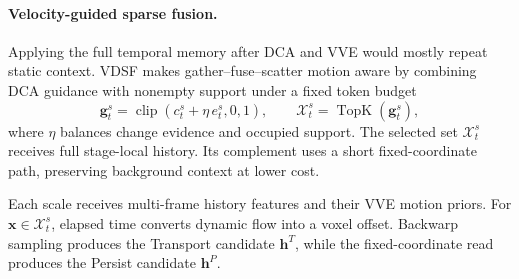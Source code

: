 \documentclass{article}
\begin{document}
\paragraph{Velocity-guided sparse fusion.}
Applying the full temporal memory after DCA and VVE would mostly repeat static
context. VDSF makes gather--fuse--scatter \citep{STCOcc} motion aware by
combining DCA guidance with nonempty support under a fixed token budget
\begin{equation}
  \mathbf g_t^s=\operatorname{clip}
  (c_t^s+\eta\,e_t^s,0,1),
  \qquad
  \mathcal X_t^s=\operatorname{TopK}(\mathbf g_t^s),
  \label{eq:vdsf_selection}
\end{equation}
where $\eta$ balances change evidence and occupied support. The selected set
$\mathcal X_t^s$ receives full stage-local history. Its complement uses a short
fixed-coordinate path, preserving background context at lower cost.

Each scale receives multi-frame history features and their VVE motion priors.
For $\mathbf x\in\mathcal X_t^s$, elapsed time converts dynamic flow into a
voxel offset. Backwarp sampling produces the Transport candidate $\mathbf h^T$,
while the fixed-coordinate read produces the Persist candidate $\mathbf h^P$.
\end{document}
